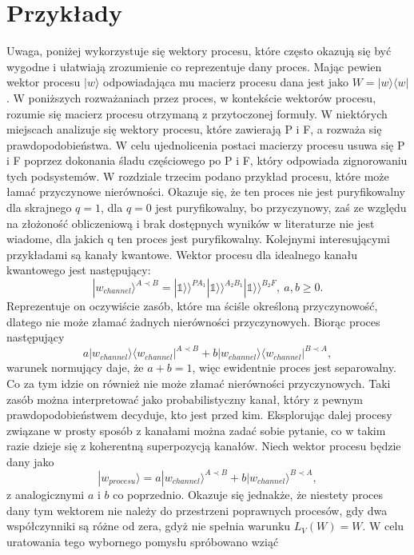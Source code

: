 \documentclass[10pt]{article} %
\newcommand{\Ket}[1]{|#1\rangle}
\newcommand{\Bra}[1]{\langle#1|}
\newcommand{\KKet}[1]{|#1\rangle\rangle}
\newcommand{\I}{\mathbb{1}}
\begin{document}
\section{Przykłady}
Uwaga, poniżej wykorzystuje się wektory procesu, które często okazują się być wygodne i ułatwiają zrozumienie co reprezentuje dany proces.
Mając pewien wektor procesu $\Ket{w}$ odpowiadająca mu macierz procesu dana jest jako $W = \Ket{w}\Bra{w}$. W poniższych rozważaniach przez proces, w kontekście wektorów procesu, rozumie się macierz procesu otrzymaną z przytoczonej formuły. W niektórych miejscach analizuje się wektory procesu, które zawierają P i F, a rozważa się prawdopodobieństwa. W celu ujednolicenia postaci macierzy procesu usuwa się P i F poprzez dokonania śladu częściowego po P i F, który odpowiada zignorowaniu tych podsystemów.
W rozdziale trzecim podano przykład procesu, które może łamać przyczynowe nierówności. Okazuje się, że ten proces nie jest puryfikowalny dla skrajnego $q = 1$, dla $q=0$ jest puryfikowalny, bo przyczynowy, zaś ze względu na złożoność obliczeniową i brak dostępnych wyników w literaturze nie jest wiadome, dla jakich q ten proces jest puryfikowalny.
Kolejnymi interesującymi przykładami są kanały kwantowe. Wektor procesu dla idealnego kanału kwantowego jest następujący:
\begin{equation}
\Ket{w_{channel}}^{A \prec B} = \KKet{\I}^{PA_1}\KKet{\I}^{A_2B_1}\KKet{\I}^{B_2F},~ a,b\geq0.
\end{equation}
Reprezentuje on oczywiście zasób, które ma ściśle określoną przyczynowość, dlatego nie może złamać żadnych nierówności przyczynowych.
Biorąc proces następujący
\begin{equation}
a\Ket{w_{channel}}\Bra{w_{channel}}^{A \prec B} + b\Ket{w_{channel}}\Bra{w_{channel}}^{B \prec A},
\end{equation} warunek normujący daje, że $a+b=1$, więc ewidentnie proces jest separowalny. Co za tym idzie on również nie może złamać nierówności przyczynowych. Taki zasób można interpretować jako probabilistyczny kanał, który z pewnym prawdopodobieństwem decyduje, kto jest przed kim.
Eksplorując dalej procesy związane w prosty sposób z kanałami można zadać sobie pytanie, co w takim razie dzieje się z koherentną superpozycją kanałów. Niech wektor procesu będzie dany jako
\begin{equation}
\Ket{w_{procesu}} = a\Ket{w_{channel}}^{A \prec B} + b\Ket{w_{channel}}^{B \prec A},
\end{equation} z analogicznymi $a$ i $b$ co poprzednio.
Okazuje się jednakże, że niestety proces dany tym wektorem nie należy do przestrzeni poprawnych procesów, gdy dwa współczynniki są różne od zera, gdyż nie spełnia warunku $L_V(W) = W$. W celu uratowania tego wybornego pomysłu spróbowano wziąć 
\end{document}
